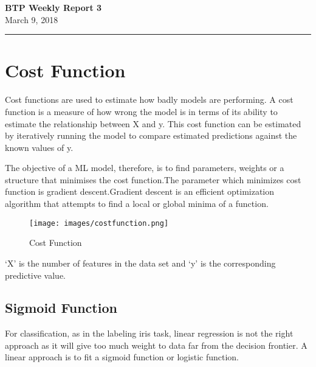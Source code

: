 \documentclass[11pt,letterpaper]{article}
\begin{document}
\begin{center}\vspace{-1cm}
\textbf{ \large BTP Weekly Report 3}\\
March 9, 2018
\end{center}

\rule{\linewidth}{0.1mm}


\bigskip
\bigskip
\bigskip
\bigskip


\flushbottom
\maketitle

\thispagestyle{empty}


\section*{Cost Function}
Cost functions are used to estimate how badly models are performing. A cost function is a measure of how wrong the model is in terms of its ability to estimate the relationship between X and y. This cost function can be estimated by iteratively running the model to compare estimated predictions against the known values of y.

 The objective of a ML model, therefore, is to find parameters, weights or a structure that minimises the cost function.The parameter which minimizes cost function is gradient descent.Gradient descent is an efficient optimization algorithm that attempts to find a local or global minima of a function.


\begin{figure}[ht]
\centering
\label{fig:costfunction}
\graphicspath{ {images/} }
\texttt{[image: images/costfunction.png]}
\caption{Cost Function}
\end{figure}
‘X’ is the number of features in the data set and ‘y’ is the corresponding predictive value.

\subsection{Sigmoid Function}
For classification, as in the labeling iris task, linear regression is not the right approach as it will give too much weight to data far from the decision frontier. A linear approach is to fit a sigmoid function or logistic function.
\end{document}
